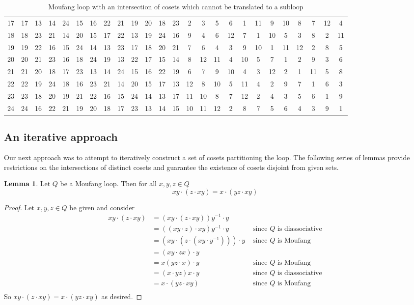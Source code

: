 \documentclass[12pt]{report}
\theoremstyle{definition}
\newtheorem{lem}[thm]{Lemma}
\begin{document}
\begin{table}[H]
{\begin{tabular}{c | c c c c c c c c c c c c c c c c c c c c c c c c|}
    17& 17& 13& 14& 24& 15& 16& 22& 21& 19& 20& 18& 23&  2&  3&  5&  6&  1& 11&  9& 10&  8&  7& 12&  4 \\
    18& 18& 23& 21& 14& 20& 15& 17& 22& 13& 19& 24& 16&  9&  4&  6& 12&  7&  1& 10&  5&  3&  8&  2& 11 \\
    19& 19& 22& 16& 15& 24& 14& 13& 23& 17& 18& 20& 21&  7&  6&  4&  3&  9& 10&  1& 11& 12&  2&  8&  5 \\
    20& 20& 21& 23& 16& 18& 24& 19& 13& 22& 17& 15& 14&  8& 12& 11&  4& 10&  5&  7&  1&  2&  9&  3&  6 \\
    21& 21& 20& 18& 17& 23& 13& 14& 24& 15& 16& 22& 19&  6&  7&  9& 10&  4&  3& 12&  2&  1& 11&  5&  8 \\
    22& 22& 19& 24& 18& 16& 23& 21& 14& 20& 15& 17& 13& 12&  8& 10&  5& 11&  4&  2&  9&  7&  1&  6&  3 \\
    23& 23& 18& 20& 19& 21& 22& 16& 15& 24& 14& 13& 17& 11& 10&  8&  7& 12&  2&  4&  3&  5&  6&  1&  9 \\
    24& 24& 16& 22& 21& 19& 20& 18& 17& 23& 13& 14& 15& 10& 11& 12&  2&  8&  7&  5&  6&  4&  3&  9&  1 \\
    \hline
  \end{tabular}}
  \caption{Moufang loop with an intersection of cosets which cannot be translated to a subloop}
\end{table}

\subsection{An iterative approach}

Our next approach was to attempt to iteratively construct a set of cosets partitioning the loop. The
  following series of lemmas provide restrictions on the intersections of distinct cosets and guarantee
  the existence of cosets disjoint from given sets.

\begin{lem}\label{tech-cosets}
  Let $Q$ be a Moufang loop. Then for all $x, y, z\in Q$ 
  \[xy\cdot (z\cdot xy) = x\cdot (yz\cdot xy)\]
\end{lem}

\begin{proof}
  Let $x, y, z\in Q$ be given and consider
  \begin{align*}
    xy\cdot (z\cdot xy) &= (xy\cdot (z\cdot xy))y^{-1}\cdot y\\
    &= ((xy\cdot z)\cdot xy)y^{-1}\cdot y &\text{ since $Q$ is diassociative}\\
    &= (xy \cdot (z \cdot (xy \cdot y^{-1})))\cdot y &\text{ since $Q$ is Moufang}\\
    &= (xy \cdot zx)\cdot y\\
    &= x(yz\cdot x)\cdot y &\text{ since $Q$ is Moufang}\\
    &= (x\cdot yz)x\cdot y &\text{ since $Q$ is diassociative}\\
    &= x\cdot (yz\cdot xy) &\text{ since $Q$ is Moufang}\\
  \end{align*}
  So $xy\cdot(z\cdot xy) = x\cdot(yz\cdot xy)$ as desired.
\end{proof}
\end{document}
